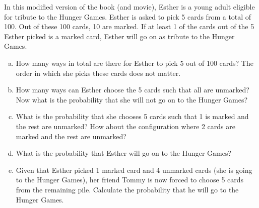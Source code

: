 \documentclass[]{article}
\newif\ifmotivation
\begin{document}
\begin{qunlist}
%
%



In this modified version of the book (and movie), Esther is a young adult eligible for tribute to the Hunger Games. Esther is asked to pick 5 cards from a total of 100. Out of these 100 cards, 10 are marked. If at least 1 of the cards out of the 5 Esther picked is a marked card, Esther will go on as tribute to the Hunger Games. 

\begin{enumerate}[a)]
  \qpart
\item How many ways in total are there for Esther to pick 5 out of 100 cards? The order in which she picks these cards does not matter. 
  
  \qpart
\item How many ways can Esther choose the 5 cards such that all are unmarked? Now what is the probability that she will not go on to the Hunger Games? 
  
  \qpart
\item What is the probability that she chooses 5 cards such that 1 is marked and the rest are unmarked? How about the configuration where 2 cards are marked and the rest are unmarked? 
  
  \qpart
\item What is the probability that Esther will go on to the Hunger Games? 
  
  \qpart
\item Given that Esther picked 1 marked card and 4 unmarked cards (she is going to the Hunger Games), her friend Tommy is now forced to choose 5 cards from the remaining pile. Calculate the probability that he will go to the Hunger Games. 
\end{enumerate}

\ifmotivation
{\motivation {Motivation - Basic counting and probability.}}
\fi 


\end{qunlist}
\end{document}
